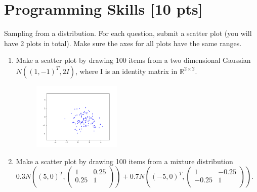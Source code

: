 \documentclass[a4paper]{article}
\theoremstyle{definition}
\newenvironment{soln}{
	\leavevmode\color{blue}\ignorespaces
}{}
\begin{document}
	
	
	\section{Programming Skills [10 pts]}
	Sampling from a distribution.  For each question, submit a scatter plot (you will have 2 plots in total).  Make sure the axes for all plots have the same ranges.
	\begin{enumerate}
		\item Make a scatter plot by drawing 100 items from a two dimensional Gaussian $N((1, -1)^{T}, 2I)$, where I is an identity matrix in $\mathbb{R}^{2 \times 2}$.
		
			\begin{soln}
			
			 \begin{figure}[h!]
			     \centering
			     \includegraphics[width=0.4\textwidth]{firstscatter.png}  
			     \captionsetup{labelformat=empty}
			     \caption{}
			     \label{fig:fig1}
			 \end{figure}
		\end{soln}
	
		\item Make a scatter plot by drawing 100 items from a mixture distribution 
		$0.3 N\left((5, 0)^{T}, \begin{pmatrix} 1 & 0.25 \\ 0.25 & 1\\ \end{pmatrix}\right)
		+0.7 N\left((-5, 0)^{T}, \begin{pmatrix} 1 & -0.25 \\ -0.25 & 1\\ \end{pmatrix}\right)
		$.
		
		\begin{soln}
			

\end{soln}
\end{enumerate}
\end{document}
